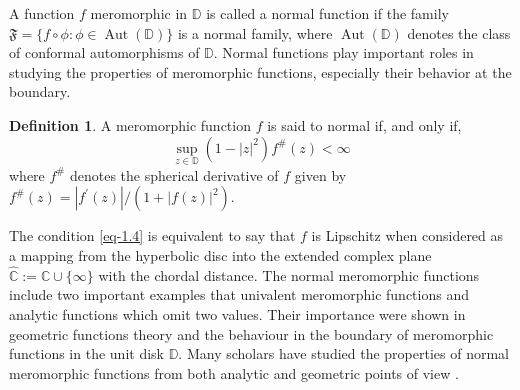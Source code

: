 \documentclass[a4paper,12pt]{amsart}
\theoremstyle{plain}
\theoremstyle{definition}
\newtheorem{defn}{Definition}[section]
\newcounter {own}
\newcommand{\Aut}{{\operatorname{Aut}}}
\begin{document}
A function $ f $ meromorphic in $ \mathbb{D} $ is called a normal function if the family $\mathfrak{F}=\{f\circ\phi: \phi\in \Aut(\mathbb{D})\}$ is a normal family, where $\Aut(\mathbb{D})$ denotes the class of conformal automorphisms of $\mathbb{D}$. Normal functions play important roles in studying the properties of meromorphic functions, especially their behavior at the boundary.
\begin{defn}\cite{Noshiro-JFSHU-1938,Yosida-PPMSJS-1934}
A meromorphic function $f$ is said to normal if, and only if, 
\begin{equation}\label{eq-1.4}
	\sup_{z\in\mathbb{D}}\left(1-|z|^2\right)f^{\#}(z)<\infty
\end{equation} 
where $ f^{\#} $ denotes the spherical derivative of $ f $ given by $f^{\#}(z)= {|f^{\prime}(z)|}/{(1+|f(z)|^2)}$.
\end{defn}
The condition \eqref{eq-1.4} is equivalent to say that $f$ is Lipschitz when considered as a mapping from the hyperbolic disc into the extended complex plane $\hat{\mathbb{C}}:=\mathbb{C}\cup \{\infty\}$ with the chordal distance. The normal meromorphic functions include two important examples that univalent meromorphic functions and analytic functions which omit two values. Their importance were shown in geometric functions theory and the behaviour
in the boundary of meromorphic functions in the unit disk $\mathbb{D}$. Many scholars have studied the properties of normal meromorphic functions from both analytic and geometric points of view \cite{Yamashita-MZ-1975,Pommerenke-MMJ-1974,Clunie-Anderson-Pommerenke-JRM-1974}. \vspace{1.5mm}
\end{document}
